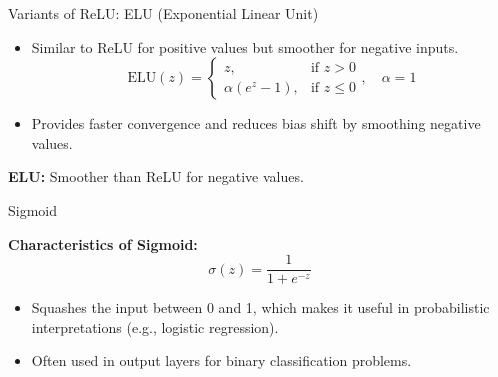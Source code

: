 \documentclass[serif, aspectratio=169]{beamer}
\begin{document}
\begin{frame}{Variants of ReLU: ELU (Exponential Linear Unit)}
    \begin{itemize}
        \item Similar to ReLU for positive values but smoother for negative inputs.
        \begin{equation*}
            \text{ELU}(z) =
            \begin{cases}
                z, & \text{if } z > 0 \\
                \alpha (e^z - 1), & \text{if } z \leq 0
            \end{cases}, \quad \alpha = 1
        \end{equation*}
        \item Provides faster convergence and reduces bias shift by smoothing negative values.
    \end{itemize}
                \begin{center}
            \end{center}
            \vspace{-0.3cm}
            \centering
            \textbf{ELU:} Smoother than ReLU for negative values.
\end{frame}

\begin{frame}{Sigmoid}

    \textbf{Characteristics of Sigmoid:}
    \begin{equation*}
              \sigma(z) = \frac{1}{1 + e^{-z}}
    \end{equation*}
    \begin{itemize}
        \item Squashes the input between 0 and 1, which makes it useful in probabilistic interpretations (e.g., logistic regression).
        \item Often used in output layers for binary classification problems.
    \end{itemize}

    \begin{center}
    \end{center}
\end{frame}
\end{document}
